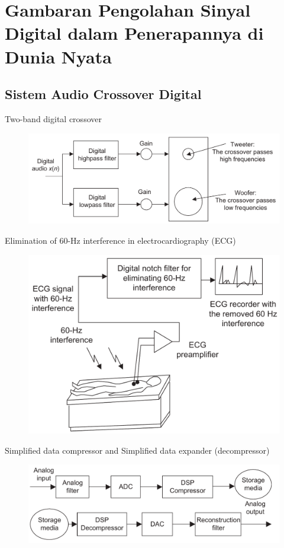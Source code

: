 \documentclass[pdflatex,compress,mathserif]{beamer}
\begin{document}
\section{Gambaran Pengolahan Sinyal Digital dalam Penerapannya di Dunia Nyata }

\subsection{Sistem Audio Crossover Digital}

\begin{frame}{Two-band digital crossover}
	\begin{figure}
		\includegraphics[width=0.8\linewidth]{img/img07}
	\end{figure}
\end{frame}

\begin{frame}{Elimination of 60-Hz interference in electrocardiography (ECG)}
	\begin{figure}
		\includegraphics[width=0.8\linewidth]{img/img08}
	\end{figure}
\end{frame}

\begin{frame}{Simplified data compressor and Simplified data expander (decompressor)}
	\begin{figure}
		\includegraphics[width=0.8\linewidth]{img/img09}
	\end{figure}
\end{frame}
\end{document}
